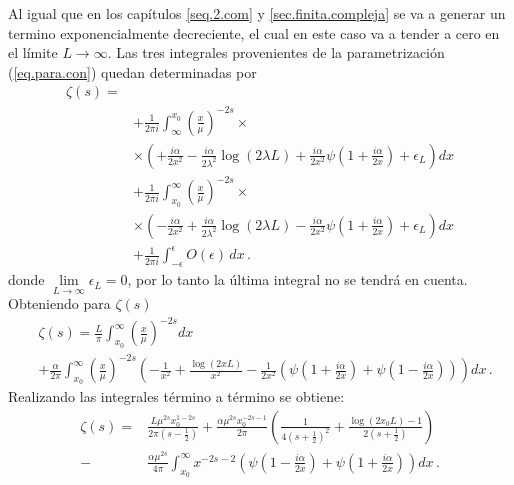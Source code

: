 Al igual que en los capítulos \ref{seq.2.com} y  \ref{sec.finita.compleja} se va a generar un termino exponencialmente decreciente, el cual en este caso va a tender a cero en el límite $L \rightarrow \infty$. Las tres integrales provenientes de la parametrización (\ref{eq.para.con}) quedan determinadas por 
\begin{align}
\zeta (s) =& \\
& +
\nonumber
	\frac{ 1 }{2 \pi i}  
	\int _{\infty} ^{x _0} 
	\left( \frac{x}{\mu} \right) ^{-2s} \times
\\
&
\nonumber
	\times
	\left( +
	\frac{i \alpha}{2 x^2} - 
	\frac{i \alpha }{2 \lambda ^2} \log ( 2 \lambda L ) +
	\frac{i \alpha}{2 x ^2 } \psi \left( 1 + \frac{i \alpha}{2 x} \right) +
	\epsilon _L
	\right)
	d x
\label{int1}	
\\
\nonumber
& +
	\frac{ 1 }{2 \pi i}  
	\int _{x _0} ^{\infty} 
	\left( \frac{x}{\mu} \right) ^{-2s}
	\times
\\
&
	\times	
	\left( -
	\frac{i \alpha}{2 x^2} + 
	\frac{i \alpha }{2 \lambda ^2} \log ( 2 \lambda L ) -
	\frac{i \alpha}{2 x ^2 } \psi \left( 1 + \frac{i \alpha}{2 x} \right) +
	\epsilon _L
	\right)
	d x
\nonumber
\\
& +
\nonumber
	\frac{ 1 }{2 \pi i}	
	\int _{- \epsilon} ^{\epsilon}
	O (\epsilon) \, dx
\, .	
\end{align}
donde $\lim \limits _{L \rightarrow \infty} \epsilon _L = 0$, por lo tanto la última integral no se tendrá en cuenta. Obteniendo para $\zeta(s) $
\begin{align}
&
	\zeta (s)=
	\frac{L }{\pi}
	\int _ {x_0} ^{\infty} \left( \frac{x}{\mu} \right) ^{-2s} dx
\\	 
& 
\nonumber
	+
	\frac{\alpha }{2 \pi } \int _{x_0} ^{\infty} 
	\left( \frac{x}{\mu} \right) ^{-2s}
	\left(-
	\frac{1}{ x ^2} +
	\frac{\log \left( 2 x L \right) }{x ^2}  -
	\frac{1}{ 2 x ^2 } 
	\left(
	\psi \left( 1 + \frac{i \alpha}{2  x} \right) + \psi \left( 1 - \frac{i \alpha}{2 x} \right) 
	\right)
	\right)
	d x
	\, .
\end{align}
Realizando las integrales término a término se obtiene:
\begin{align}
	\zeta (s)=
&
\nonumber
	\frac{L  \mu ^{2s} x _0 ^{1-2s} }{2 \pi \left( s- \frac{1}{2} \right)}  + 
	\frac{\alpha \mu ^{2s} x _{0} ^{-2s-1} }{2 \pi} 
	\left( 
	\frac{1}{4 \left(s+ \frac{1}{2} \right) ^2} +
	\frac{\log(2 x _0 L) -1 }{2 \left(s+\frac{1}{2} \right)} 
	\right) 
\\
-
&	
	\frac{\alpha \mu ^{2s} }{4 \pi}
	\int _{x_0} ^{\infty} 
	x ^{-2s-2}
	\left(
	\psi \left( 1 - \frac{i \alpha}{2 x} \right) +
	\psi \left( 1 + \frac{i \alpha}{2 x} \right)
	\right)
	dx
\, .
\end{align}
